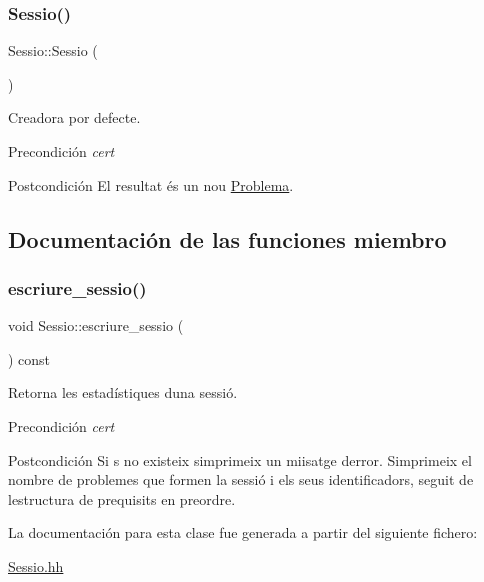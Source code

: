 \subsubsection{\texorpdfstring{Sessio()}{Sessio()}}
{\footnotesize\ttfamily Sessio\+::\+Sessio (\begin{DoxyParamCaption}{ }\end{DoxyParamCaption})}



Creadora por defecte. 

\begin{DoxyPrecond}{Precondición}
{\itshape cert} 
\end{DoxyPrecond}
\begin{DoxyPostcond}{Postcondición}
El resultat és un nou \mbox{\hyperlink{class_problema}{Problema}}. 
\end{DoxyPostcond}


\subsection{Documentación de las funciones miembro}
\mbox{\label{class_sessio_a4a9fcbfd3973be306c7076af557a431c}} 
\subsubsection{\texorpdfstring{escriure\+\_\+sessio()}{escriure\_sessio()}}
{\footnotesize\ttfamily void Sessio\+::escriure\+\_\+sessio (\begin{DoxyParamCaption}{ }\end{DoxyParamCaption}) const}



Retorna les estadístiques d\textquotesingle{}una sessió. 

\begin{DoxyPrecond}{Precondición}
{\itshape cert} 
\end{DoxyPrecond}
\begin{DoxyPostcond}{Postcondición}
Si s no existeix s\textquotesingle{}imprimeix un miisatge d\textquotesingle{}error. S\textquotesingle{}imprimeix el nombre de problemes que formen la sessió i els seus identificadors, seguit de l\textquotesingle{}estructura de prequisits en preordre. 
\end{DoxyPostcond}


La documentación para esta clase fue generada a partir del siguiente fichero\+:\begin{DoxyCompactItemize}
\item 
\mbox{\hyperlink{_sessio_8hh}{Sessio.\+hh}}\end{DoxyCompactItemize}
